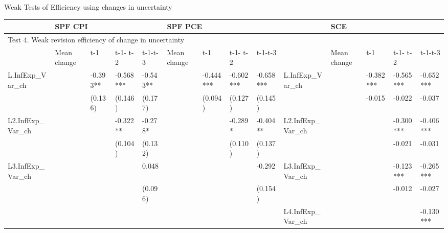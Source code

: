 \documentclass{beamer}
\begin{document}
\begin{frame}{Weak Tests of Efficiency using changes in uncertainty}
\begin{adjustbox}{width=\textwidth}
	\begin{threeparttable}
				\label{VarWeakRevEfficiency}
		\begin{tabular}{llllllllllllll}
			\hline 
			& \multicolumn{4}{l}{SPF CPI}                     & \multicolumn{4}{l}{SPF PCE}                       &                      & \multicolumn{4}{l}{SCE}                           \\
			\hline 
			\multicolumn{14}{l}{Test 4. Weak revision efficiency of change in uncertainty}                \\
			\hline                                                                                                                 
			& Mean change & t-1       & t-1- t-2  & t-1-t-3   & Mean change   & t-1       & t-1- t-2  & t-1-t-3   &                      & Mean change   & t-1       & t-1- t-2  & t-1-t-3   \\
			\hline 
			L.InfExp\_Var\_ch    &             & -0.393**  & -0.568*** & -0.543**  &               & -0.444*** & -0.602*** & -0.658*** & L.InfExp\_Var\_ch    &               & -0.382*** & -0.565*** & -0.652*** \\
			&             & (0.136)   & (0.146)   & (0.177)   &               & (0.094)   & (0.127)   & (0.145)   &                      &               & -0.015    & -0.022    & -0.037    \\
			L2.InfExp\_Var\_ch   &             &           & -0.322**  & -0.278*   &               &           & -0.289*   & -0.404**  & L2.InfExp\_Var\_ch   &               &           & -0.300*** & -0.406*** \\
			&             &           & (0.104)   & (0.132)   &               &           & (0.110)   & (0.137)   &                      &               &           & -0.021    & -0.031    \\
			L3.InfExp\_Var\_ch   &             &           &           & 0.048     &               &           &           & -0.292    & L3.InfExp\_Var\_ch   &               &           & -0.123*** & -0.265*** \\
			&             &           &           & (0.096)   &               &           &           & (0.154)   &                      &               &           & -0.012    & -0.027    \\
			&             &           &           &           &               &           &           &           & L4.InfExp\_Var\_ch   &               &           &           & -0.130*** \\

\end{tabular}
\end{threeparttable}
\end{adjustbox}
\end{frame}
\end{document}
